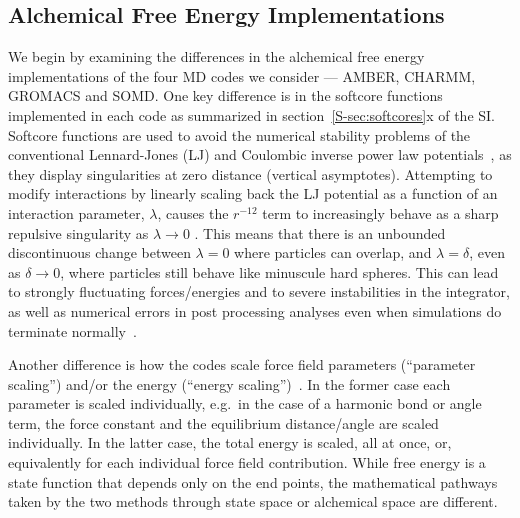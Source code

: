 \documentclass[journal=jctcce,manuscript=article]{achemso}
\begin{document}
\subsection{Alchemical Free Energy Implementations}
\label{sec:afe_impl}

We begin by examining the differences in the alchemical free energy
implementations of the four MD codes we consider --- AMBER, CHARMM, GROMACS and
SOMD.  One key difference is in the softcore
functions~\cite{beutler_avoiding_1994, zacharias_separationshifted_1994}
implemented in each code as summarized in section~\ref{S-sec:softcores}x of the
SI.  Softcore functions are used to avoid the numerical
stability problems of the conventional Lennard-Jones (LJ) and Coulombic inverse power law
potentials~\cite{ISI:A1993MB07100015,steinbrecher_nonlinear_2007}, as they display singularities at
zero distance (vertical asymptotes).  Attempting to modify interactions by
linearly scaling back the LJ potential as a function of an
interaction parameter, $\lambda$, causes the $r^{-12}$ term to increasingly behave
as a sharp repulsive singularity as $\lambda\rightarrow 0$ \cite{ISI:A1993MB07100015}.  This means that there
is an unbounded discontinuous change between $\lambda = 0$ where particles can overlap,
and $\lambda = \delta$, even as $\delta \rightarrow 0$, where particles still
behave like minuscule hard spheres.  This can lead to strongly
fluctuating forces/energies and to severe instabilities in the integrator, as
well as numerical errors in post processing analyses even when simulations do
terminate normally~\cite{beutler_avoiding_1994,
zacharias_separationshifted_1994, steinbrecher_nonlinear_2007}.

Another difference is how the codes scale force field parameters (``parameter
scaling'') and/or the energy (``energy
scaling'')~\cite{doi:10.1021/jp981628n}.  In the former case each parameter is
scaled individually, e.g.\ in the case of a harmonic bond or angle term,
the force constant and the equilibrium distance/angle are scaled
individually.  In the
latter case, the total energy is scaled, all at once, or, equivalently for each
individual force field contribution.  While free energy is a state function that
depends only on the end points, the mathematical pathways taken by the
two methods through state space or alchemical space are different.
\end{document}
